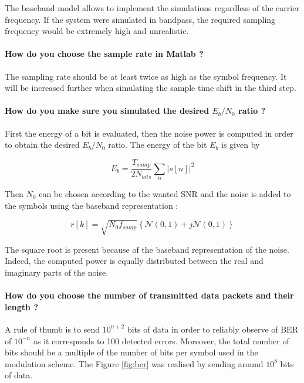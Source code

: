 The baseband model allows to implement the simulations regardless of the carrier frequency. If the system were simulated in bandpass, the required sampling frequency would be extremely high and unrealistic.

\paragraph{How do you choose the sample rate in Matlab ?} \mbox{}

The sampling rate should be at least twice as high as the symbol frequency. It will be increased further when simulating the sample time shift in the third step.

\paragraph{How do you make sure you simulated the desired $E_b/N_0$ ratio ?} \mbox{}

First the energy of a bit is evaluated, then the noise power is computed in order to obtain the desired $E_b/N_0$ ratio. The energy of the bit $E_b$ is given by

\begin{equation*}
    E_b = \frac{T_{samp}}{2 N_{bits}} \sum_{n} {\left| s \left[ n \right] \right|}^2
\end{equation*}

Then $N_0$ can be chosen according to the wanted SNR and the noise is added to the symbols using the baseband representation :

\begin{equation*}
    r \left[ k \right] = \sqrt{N_0 f_{samp}} \left\{ \mathcal{N}(0,1) + j \mathcal{N}(0,1) \right\}  
\end{equation*}

The square root is present because of the baseband representation of the noise. Indeed, the computed power is equally distributed between the real and imaginary parts of the noise.

\paragraph{How do you choose the number of transmitted data packets and their length ?} \mbox{}

A rule of thumb is to send $10^{n+2}$ bits of data in order to reliably observe of BER of $10^{-n}$ as it corresponds to 100 detected errors. Moreover, the total number of bits should be a multiple of the number of bits per symbol used in the modulation scheme. The Figure \ref{fig:ber} was realised by sending around $10^8$ bits of data.

